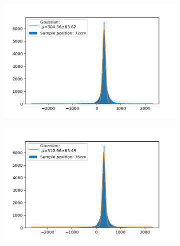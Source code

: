 \documentclass[]{article}
\begin{document}
\begin{figure}[H]
\medskip
\begin{subfigure}{0.48\textwidth}
\includegraphics[width=\linewidth]{Plots/Pos/72cm.png}
\end{subfigure}
\begin{subfigure}[c]{0.48\linewidth}
\includegraphics[width=\linewidth]{Plots/Pos/76cm.png}
\end{subfigure}


\end{figure}
\end{document}
